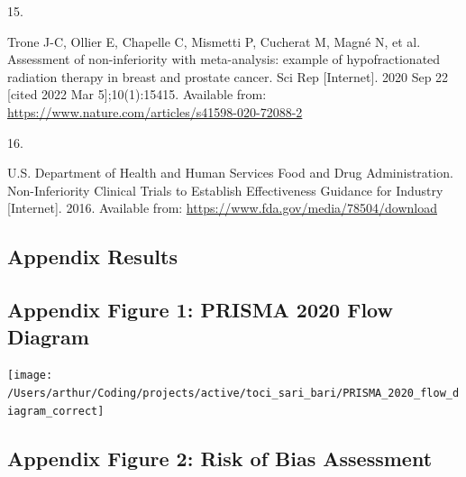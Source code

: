 \documentclass[
  12pt,
]{article}
\newlength{\cslhangindent}
\newlength{\csllabelwidth}
\newlength{\cslentryspacingunit} %
\newenvironment{CSLReferences}[2] %
 {%
  \setlength{\parindent}{0pt}
  \ifodd #1
  \let\oldpar\par
  \def\par{\hangindent=\cslhangindent\oldpar}
  \fi
  \setlength{\parskip}{#2\cslentryspacingunit}
 }%
 {}
\newcommand{\CSLLeftMargin}[1]{\parbox[t]{\csllabelwidth}{#1}}
\newcommand{\CSLRightInline}[1]{\parbox[t]{\linewidth - \csllabelwidth}{#1}\break}
\begin{document}
\begin{CSLReferences}{0}{0}
\leavevmode{}%
\CSLLeftMargin{15. }
\CSLRightInline{Trone J-C, Ollier E, Chapelle C, Mismetti P, Cucherat M,
Magné N, et al. Assessment of non-inferiority with meta-analysis:
example of hypofractionated radiation therapy in breast and prostate
cancer. Sci Rep {[}Internet{]}. 2020 Sep 22 {[}cited 2022 Mar
5{]};10(1):15415. Available from:
\url{https://www.nature.com/articles/s41598-020-72088-2}}

\leavevmode{}%
\CSLLeftMargin{16. }
\CSLRightInline{U.S. Department of Health and Human Services Food and
Drug Administration. Non-Inferiority Clinical Trials to Establish
Effectiveness Guidance for Industry {[}Internet{]}. 2016. Available
from: \url{https://www.fda.gov/media/78504/download}}

\end{CSLReferences}

\begin{landscape}

\hypertarget{appendix-results}{%
\section{Appendix Results}\label{appendix-results}}

\hypertarget{appendix-figure-1-prisma-2020-flow-diagram}{%
\subsection{Appendix Figure 1: PRISMA 2020 Flow
Diagram}\label{appendix-figure-1-prisma-2020-flow-diagram}}

\begin{center}\texttt{[image: /Users/arthur/Coding/projects/active/toci\_sari\_bari/PRISMA\_2020\_flow\_diagram\_correct]} \end{center}

\end{landscape}

\hypertarget{appendix-figure-2-risk-of-bias-assessment}{%
\subsection{Appendix Figure 2: Risk of Bias
Assessment}\label{appendix-figure-2-risk-of-bias-assessment}}
\end{document}
